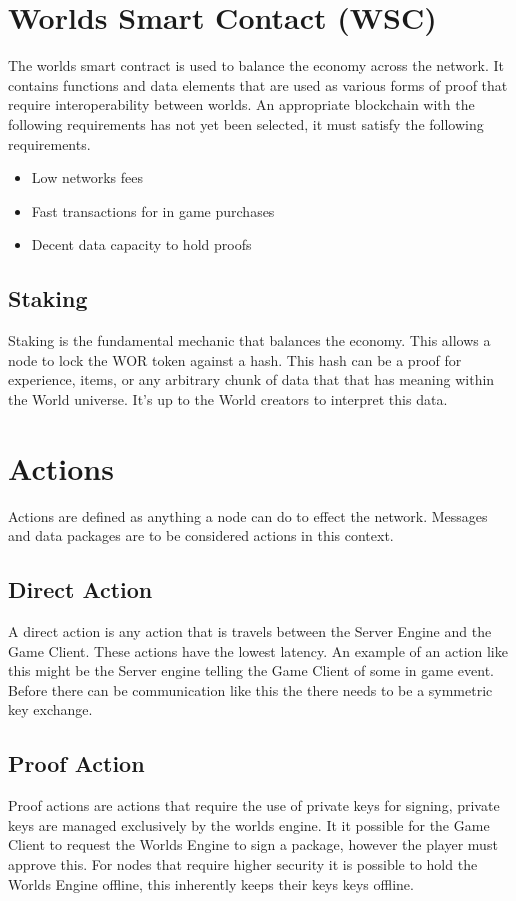 \documentclass[runningheads,a4paper]{llncs}
\begin{document}
\section{Worlds Smart Contact (WSC)}
\label{WSC}
The worlds smart contract is used to balance the economy across the network. It contains functions and data elements that are used as various forms of proof that require interoperability between worlds. An appropriate blockchain with the following requirements has not yet been selected, it must satisfy the following requirements. 

\begin{itemize}
\item{Low networks fees}
\item{Fast transactions for in game purchases}
\item{Decent data capacity to hold proofs}
\end{itemize}

\subsection{Staking} %
Staking is the fundamental mechanic that balances the economy. This allows a node to lock the WOR token against a hash. This hash can be a proof for experience, items, or any arbitrary chunk of data that that has meaning within the World universe. It's up to the World creators to interpret this data.

\section{Actions}
Actions are defined as anything a node can do to effect the network. Messages and data packages are to be considered actions in this context.

\subsection{Direct Action}
A direct action is any action that is travels between the Server Engine and the Game Client. These actions have the lowest latency. An example of an action like this might be the Server engine telling the Game Client of some in game event. Before there can be communication like this the there needs to be a symmetric key exchange. 

\subsection{Proof Action}
Proof actions are actions that require the use of private keys for signing, private keys are managed exclusively by the worlds engine. It it possible for the Game Client to request the Worlds Engine to sign a package, however the player must approve this. For nodes that require higher security it is possible to hold the Worlds Engine offline, this inherently keeps their keys keys offline. 
\end{document}
